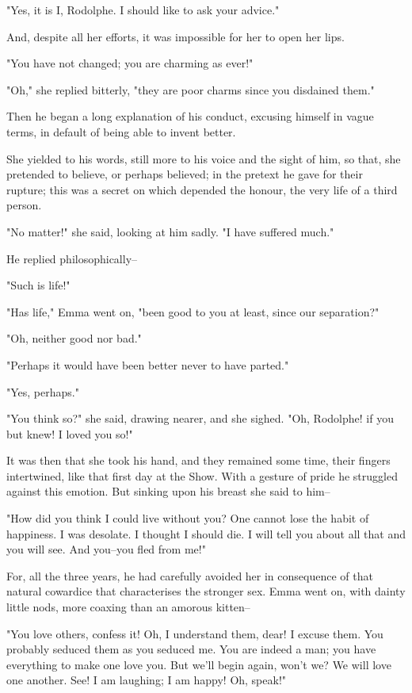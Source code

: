 \documentclass{tufte-book}
\begin{document}
"Yes, it is I, Rodolphe. I should like to ask your advice."

And, despite all her efforts, it was impossible for her to open her
lips.

"You have not changed; you are charming as ever!"

"Oh," she replied bitterly, "they are poor charms since you disdained
them."

Then he began a long explanation of his conduct, excusing himself in
vague terms, in default of being able to invent better.

She yielded to his words, still more to his voice and the sight of him,
so that, she pretended to believe, or perhaps believed; in the pretext
he gave for their rupture; this was a secret on which depended the
honour, the very life of a third person.

"No matter!" she said, looking at him sadly. "I have suffered much."

He replied philosophically--

"Such is life!"

"Has life," Emma went on, "been good to you at least, since our
separation?"

"Oh, neither good nor bad."

"Perhaps it would have been better never to have parted."

"Yes, perhaps."

"You think so?" she said, drawing nearer, and she sighed. "Oh, Rodolphe!
if you but knew! I loved you so!"

It was then that she took his hand, and they remained some time, their
fingers intertwined, like that first day at the Show. With a gesture of
pride he struggled against this emotion. But sinking upon his breast she
said to him--

"How did you think I could live without you? One cannot lose the habit
of happiness. I was desolate. I thought I should die. I will tell you
about all that and you will see. And you--you fled from me!"

For, all the three years, he had carefully avoided her in consequence
of that natural cowardice that characterises the stronger sex. Emma went
on, with dainty little nods, more coaxing than an amorous kitten--

"You love others, confess it! Oh, I understand them, dear! I excuse
them. You probably seduced them as you seduced me. You are indeed a man;
you have everything to make one love you. But we'll begin again, won't
we? We will love one another. See! I am laughing; I am happy! Oh,
speak!"
\end{document}
